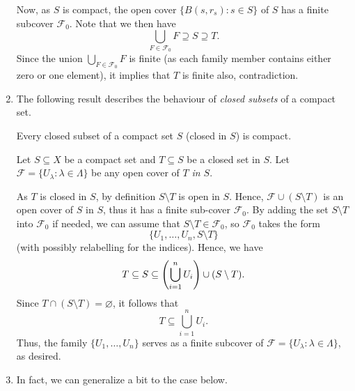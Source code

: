 \begin{enumerate}
\begin{pf}
Now, as \(S\) is compact, the open cover \(\{B(s,r_s):s\in S\}\) of \(S\) has a
finite subcover \(\mathcal{F}_0\). Note that we then have
\[
\bigcup_{F\in\mathcal{F}_0}F\supseteq S\supseteq T.
\]
Since the union \(\displaystyle \bigcup_{F\in\mathcal{F}_0}F\) is finite (as
each family member contains either zero or one element), it implies that \(T\)
is finite also, contradiction.
\end{pf}
\item The following result describes the behaviour of \emph{closed subsets} of
a compact set.
\begin{theorem}
\label{thm:subset-closed-in-cpt-is-cpt}
Every closed subset of a compact set \(S\) (closed in \(S\)) is compact.
\end{theorem}
\begin{pf}
Let \(S\subseteq X\) be a compact set and \(T\subseteq S\) be a closed set in
\(S\). Let \(\mathcal{F}=\{U_{\lambda}:\lambda\in\Lambda\}\) be any open cover
of \(T\) \emph{in \(S\)}.

As \(T\) is closed in \(S\), by definition \(S\setminus T\) is open in \(S\).
Hence, \(\mathcal{F}\cup(S\setminus T)\) is an open cover of \(S\) in \(S\),
thus it has a finite sub-cover \(\mathcal{F}_0\). By adding the set
\(S\setminus T\) into \(\mathcal{F}_0\) if needed, we can assume that
\(S\setminus T\in\mathcal{F}_0\), so \(\mathcal{F}_0\) takes the form
\[
\{U_1,\dotsc,U_n,S\setminus T\}
\]
(with possibly relabelling for the indices). Hence, we have
\[
T\subseteq S\subseteq \qty(\bigcup_{i=1}^{n}U_i)\cup (S\setminus T).
\]
Since \(T\cap (S\setminus T)=\varnothing\), it follows that
\[
T\subseteq \bigcup_{i=1}^{n}U_i.
\]
Thus, the family \(\{U_1,\dotsc,U_n\}\) serves as a finite subcover of
\(\mathcal{F}=\{U_{\lambda}:\lambda\in\Lambda\}\), as desired.
\end{pf}
\item In fact, we can generalize  a bit to
the case below.


\end{enumerate}
